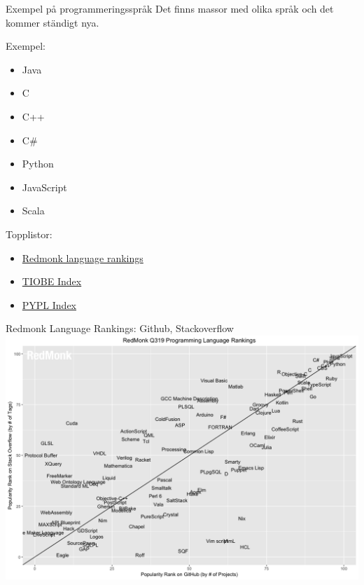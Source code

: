 \begin{Slide}{Exempel på programmeringsspråk}
Det finns massor med olika språk och det kommer ständigt nya.
\vspace{1em}
\begin{multicols}{2}
Exempel:
\begin{itemize}
\item Java
\item C
\item C++
\item C\#
\item Python
\item JavaScript
\item Scala
\end{itemize}

\columnbreak %

Topplistor:
\begin{itemize}
\item \href{https://redmonk.com/sogrady/2019/07/18/language-rankings-6-19/}{Redmonk language rankings}   
\item \href{http://www.tiobe.com/index.php/content/paperinfo/tpci/index.html}{TIOBE Index}
\item \href{http://pypl.github.io/PYPL.html}{PYPL Index}
\end{itemize}
\end{multicols}

\end{Slide}

\ifkompendium\else
\begin{SlideExtra}{Redmonk Language Rankings: Github, Stackoverflow}
\includegraphics[width=0.95\columnwidth]{../img/redmonk-Q619}
\end{SlideExtra}
\fi

